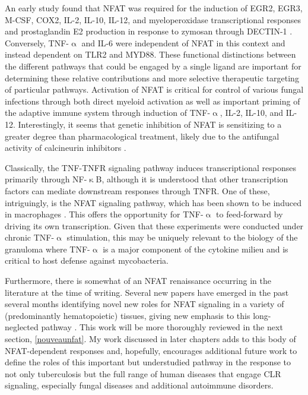 An early study found that NFAT was required for the induction of EGR2, EGR3, M\hyp{}CSF, COX2, IL\hyp{}2, IL\hyp{}10, IL\hyp{}12, and myeloperoxidase transcriptional responses and prostaglandin E2 production in response to zymosan through DECTIN\hyp{}1 \citep{Goodridge2007}. Conversely, TNF\hyp{}$\upalpha$ and IL\hyp{}6 were independent of NFAT in this context and instead dependent on TLR2 and MYD88. These functional distinctions between the different pathways that could be engaged by a single ligand are important for determining these relative contributions and more selective therapeutic targeting of particular pathways. Activation of NFAT is critical for control of various fungal infections through both direct myeloid activation as well as important priming of the adaptive immune system through induction of TNF\hyp{}$\upalpha$, IL\hyp{}2, IL\hyp{}10, and IL\hyp{}12. Interestingly, it seems that genetic inhibition of NFAT is sensitizing to a greater degree than pharmacological treatment, likely due to the antifungal activity of calcineurin inhibitors \citep{Herbst2015, Xu2009, Zelante2017, Sugita2005}.

Classically, the TNF\hyp{}TNFR signaling pathway induces transcriptional responses primarily through NF\hyp{}$\upkappa$B, although it is understood that other transcription factors can mediate downstream responses through TNFR. One of these, intriguingly, is the NFAT signaling pathway, which has been shown to be induced in macrophages \citep{Yarilina2011}. This offers the opportunity for TNF\hyp{}$\upalpha$ to feed\hyp{}forward by driving its own transcription. Given that these experiments were conducted under chronic TNF\hyp{}$\upalpha$ stimulation, this may be uniquely relevant to the biology of the granuloma where TNF\hyp{}$\upalpha$ is a major component of the cytokine milieu and is critical to host defense against mycobacteria.

Furthermore, there is somewhat of an NFAT renaissance occurring in the literature at the time of writing. Several new papers have emerged in the past several months identifying novel new roles for NFAT signaling in a variety of (predominantly hematopoietic) tissues, giving new emphasis to this long\hyp{}neglected pathway \citep{Deerhake2021, Poli2022, Peuker2022}. This work will be more thoroughly reviewed in the next section, \autoref{nouveaunfat}. My work discussed in later chapters adds to this body of NFAT\hyp{}dependent responses and, hopefully, encourages additional future work to define the roles of this important but understudied pathway in the response to not only tuberculosis but the full range of human diseases that engage CLR signaling, especially fungal diseases and additional autoimmune disorders.

